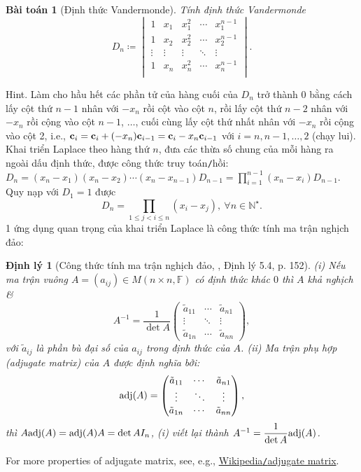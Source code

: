 \documentclass{article}
\newtheorem{baitoan}{Bài toán}
\newtheorem{dinhly}{Định lý}
\begin{document}
\begin{baitoan}[Định thức Vandermonde]
	Tính định thức Vandermonde
	\begin{equation*}
		D_n\coloneqq\begin{vmatrix}
			1 & x_1 & x_1^2 & \cdots & x_1^{n-1}\\
			1 & x_2 & x_2^2 & \cdots & x_2^{n-1}\\
			\vdots & \vdots & \vdots & \ddots & \vdots\\
			1 & x_n & x_n^2 & \cdots & x_n^{n-1}\\
		\end{vmatrix}.
	\end{equation*}
\end{baitoan}
{\sf Hint.} Làm cho hầu hết các phần tử của hàng cuối của $D_n$ trở thành 0 bằng cách lấy cột thứ $n - 1$ nhân với $-x_n$ rồi cột vào cột $n$, rồi lấy cột thứ $n - 2$ nhân với $-x_n$ rồi cộng vào cột $n - 1$, $\ldots$, cuối cùng lấy cột thứ nhất nhân với $-x_n$ rồi cộng vào cột 2, i.e., ${\bf c}_i = {\bf c}_i + (-x_n){\bf c}_{i-1} = {\bf c}_i - x_n{\bf c}_{i-1}$ với $i = n,n - 1,\ldots,2$ (chạy lui). Khai triển Laplace theo hàng thứ $n$, đưa các thừa số chung của mỗi hàng ra ngoài dấu định thức, được công thức truy toán{\tt/}hồi: $D_n = (x_n - x_1)(x_n - x_2)\cdots(x_n - x_{n-1})D_{n-1} = \prod_{i=1}^{n-1} (x_n - x_i)D_{n-1}$. Quy nạp với $D_1 = 1$ được
\begin{equation}
	\label{Vandermonde det}
	\tag{Vandermonde}
	D_n = \prod_{1\le j < i\le n} (x_i - x_j),\ \forall n\in\mathbb{N}^\star.
\end{equation}
1 ứng dụng quan trọng của khai triển Laplace là công thức tính ma trận nghịch đảo:

\begin{dinhly}[Công thức tính ma trận nghịch đảo, \cite{Hung_linear_algebra}, Định lý 5.4, p. 152]
	(i) Nếu ma trận vuông $A = (a_{ij})\in M(n\times n,\mathbb{F})$ có định thức khác $0$ thì $A$ khả nghịch \&
	\begin{equation*}
		A^{-1} = \frac{1}{\det A}\begin{pmatrix}
			\tilde{a}_{11} & \cdots & \tilde{a}_{n1}\\\vdots & \ddots & \vdots\\\tilde{a}_{1n} & \cdots & \tilde{a}_{nn}
		\end{pmatrix},
	\end{equation*}
	với $\tilde{a}_{ij}$ là phần bù đại số của $a_{ij}$ trong định thức của $A$. (ii) {\rm Ma trận phụ hợp} (adjugate matrix) của $A$ được định nghĩa bởi:
	\begin{equation*}
		{\rm adj}(A) = \begin{pmatrix}
			\tilde{a}_{11} & \cdots & \tilde{a}_{n1}\\\vdots & \ddots & \vdots\\\tilde{a}_{1n} & \cdots & \tilde{a}_{nn}
		\end{pmatrix},
	\end{equation*}
	thì $A{\rm adj}(A) = {\rm adj}(A)A = \det A I_n$, (i) viết lại thành $A^{-1} = \dfrac{1}{\det A}{\rm adj}(A)$.
\end{dinhly}
For more properties of adjugate matrix, see, e.g., \href{https://en.wikipedia.org/wiki/Adjugate_matrix}{Wikipedia{\tt/}adjugate matrix}.
\end{document}
